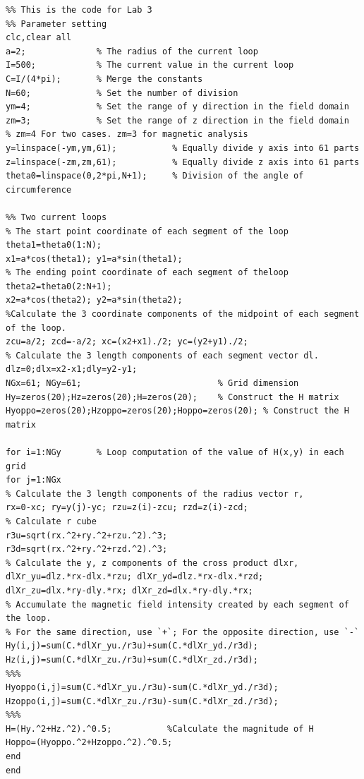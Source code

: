 \documentclass[journal,twocolumn,letterpaper]{IEEEJERM}
\begin{document}
\begin{lstlisting}
%% This is the code for Lab 3
%% Parameter setting
clc,clear all                   
a=2;              % The radius of the current loop
I=500;            % The current value in the current loop
C=I/(4*pi);       % Merge the constants
N=60;             % Set the number of division
ym=4;             % Set the range of y direction in the field domain
zm=3;             % Set the range of z direction in the field domain
% zm=4 For two cases. zm=3 for magnetic analysis
y=linspace(-ym,ym,61);           % Equally divide y axis into 61 parts
z=linspace(-zm,zm,61);           % Equally divide z axis into 61 parts
theta0=linspace(0,2*pi,N+1);     % Division of the angle of circumference  

%% Two current loops
% The start point coordinate of each segment of the loop 
theta1=theta0(1:N);                               
x1=a*cos(theta1); y1=a*sin(theta1);                     
% The ending point coordinate of each segment of theloop
theta2=theta0(2:N+1);                           
x2=a*cos(theta2); y2=a*sin(theta2);    
%Calculate the 3 coordinate components of the midpoint of each segment of the loop.
zcu=a/2; zcd=-a/2; xc=(x2+x1)./2; yc=(y2+y1)./2;   
% Calculate the 3 length components of each segment vector dl.
dlz=0;dlx=x2-x1;dly=y2-y1;
NGx=61; NGy=61;                           % Grid dimension
Hy=zeros(20);Hz=zeros(20);H=zeros(20);    % Construct the H matrix
Hyoppo=zeros(20);Hzoppo=zeros(20);Hoppo=zeros(20); % Construct the H matrix

for i=1:NGy       % Loop computation of the value of H(x,y) in each grid
for j=1:NGx
% Calculate the 3 length components of the radius vector r,
rx=0-xc; ry=y(j)-yc; rzu=z(i)-zcu; rzd=z(i)-zcd;                  
% Calculate r cube
r3u=sqrt(rx.^2+ry.^2+rzu.^2).^3;
r3d=sqrt(rx.^2+ry.^2+rzd.^2).^3;
% Calculate the y, z components of the cross product dlxr,
dlXr_yu=dlz.*rx-dlx.*rzu; dlXr_yd=dlz.*rx-dlx.*rzd;
dlXr_zu=dlx.*ry-dly.*rx; dlXr_zd=dlx.*ry-dly.*rx;
% Accumulate the magnetic field intensity created by each segment of the loop.
% For the same direction, use `+`; For the opposite direction, use `-`
Hy(i,j)=sum(C.*dlXr_yu./r3u)+sum(C.*dlXr_yd./r3d);                
Hz(i,j)=sum(C.*dlXr_zu./r3u)+sum(C.*dlXr_zd./r3d);
%%%
Hyoppo(i,j)=sum(C.*dlXr_yu./r3u)-sum(C.*dlXr_yd./r3d);                
Hzoppo(i,j)=sum(C.*dlXr_zu./r3u)-sum(C.*dlXr_zd./r3d);
%%%
H=(Hy.^2+Hz.^2).^0.5;           %Calculate the magnitude of H
Hoppo=(Hyoppo.^2+Hzoppo.^2).^0.5;         
end
end


\end{lstlisting}
\end{document}
